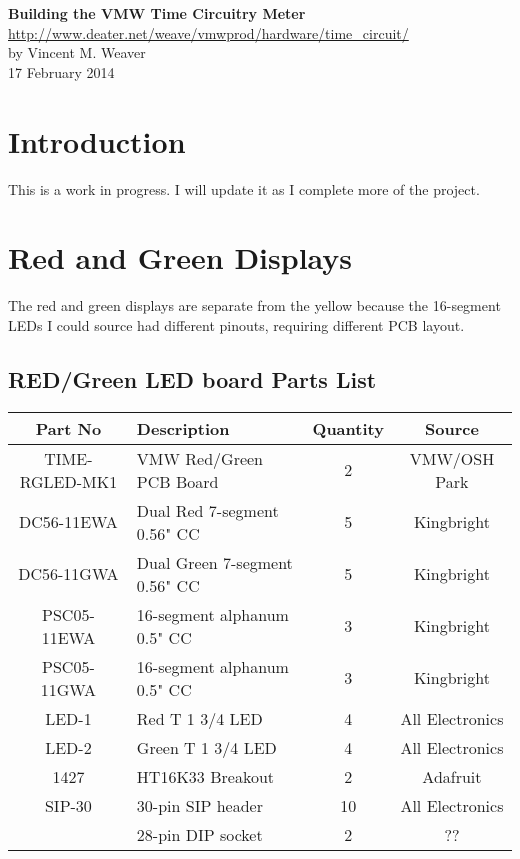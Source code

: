 \documentclass[11pt]{article}
\begin{document}
\begin{center}
{\Large \bf Building the VMW Time Circuitry Meter}\\
\url{http://www.deater.net/weave/vmwprod/hardware/time_circuit/}\\
by Vincent M. Weaver\\
17 February 2014
\end{center}


\section{Introduction}

This is a work in progress.  I will update it as I complete more
of the project.


\pagebreak
\section{Red and Green Displays}

The red and green displays are separate from the yellow because
the 16-segment LEDs I could source had different pinouts, requiring
different PCB layout.

\subsection{RED/Green LED board Parts List}

\begin{tabular}{|c|l|c|c|}
\hline
Part No   &  Description    &  Quantity    &   Source \\
\hline
\hline
TIME-RGLED-MK1 & VMW Red/Green PCB Board       & 2 & VMW/OSH Park\\ %
\hline
DC56-11EWA     & Dual Red 7-segment 0.56" CC   & 5 & Kingbright\\ %
\hline
DC56-11GWA     & Dual Green 7-segment 0.56" CC & 5 & Kingbright\\ %
\hline
PSC05-11EWA    & 16-segment alphanum 0.5" CC   & 3 & Kingbright\\ %
\hline
PSC05-11GWA    & 16-segment alphanum 0.5" CC   & 3 & Kingbright\\ %
\hline
LED-1          & Red T 1 3/4 LED               & 4 & All Electronics\\ %
\hline
LED-2          & Green T 1 3/4 LED             & 4 & All Electronics\\ %
\hline
1427           & HT16K33 Breakout              & 2 & Adafruit\\ %
\hline
SIP-30	       & 30-pin SIP header             & 10 & All Electronics\\ %
\hline
               & 28-pin DIP socket             & 2 & ?? \\ %
\hline
\end{tabular}
\end{document}
